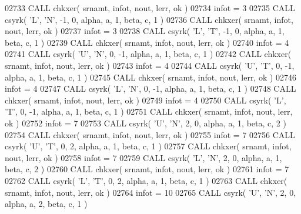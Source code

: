 \begin{DoxyCode}
02733       \textcolor{keyword}{CALL }chkxer( srnamt, infot, nout, lerr, ok )
02734       infot = 3
02735       \textcolor{keyword}{CALL }csyrk( \textcolor{stringliteral}{'L'}, \textcolor{stringliteral}{'N'}, -1, 0, alpha, a, 1, beta, c, 1 )
02736       \textcolor{keyword}{CALL }chkxer( srnamt, infot, nout, lerr, ok )
02737       infot = 3
02738       \textcolor{keyword}{CALL }csyrk( \textcolor{stringliteral}{'L'}, \textcolor{stringliteral}{'T'}, -1, 0, alpha, a, 1, beta, c, 1 )
02739       \textcolor{keyword}{CALL }chkxer( srnamt, infot, nout, lerr, ok )
02740       infot = 4
02741       \textcolor{keyword}{CALL }csyrk( \textcolor{stringliteral}{'U'}, \textcolor{stringliteral}{'N'}, 0, -1, alpha, a, 1, beta, c, 1 )
02742       \textcolor{keyword}{CALL }chkxer( srnamt, infot, nout, lerr, ok )
02743       infot = 4
02744       \textcolor{keyword}{CALL }csyrk( \textcolor{stringliteral}{'U'}, \textcolor{stringliteral}{'T'}, 0, -1, alpha, a, 1, beta, c, 1 )
02745       \textcolor{keyword}{CALL }chkxer( srnamt, infot, nout, lerr, ok )
02746       infot = 4
02747       \textcolor{keyword}{CALL }csyrk( \textcolor{stringliteral}{'L'}, \textcolor{stringliteral}{'N'}, 0, -1, alpha, a, 1, beta, c, 1 )
02748       \textcolor{keyword}{CALL }chkxer( srnamt, infot, nout, lerr, ok )
02749       infot = 4
02750       \textcolor{keyword}{CALL }csyrk( \textcolor{stringliteral}{'L'}, \textcolor{stringliteral}{'T'}, 0, -1, alpha, a, 1, beta, c, 1 )
02751       \textcolor{keyword}{CALL }chkxer( srnamt, infot, nout, lerr, ok )
02752       infot = 7
02753       \textcolor{keyword}{CALL }csyrk( \textcolor{stringliteral}{'U'}, \textcolor{stringliteral}{'N'}, 2, 0, alpha, a, 1, beta, c, 2 )
02754       \textcolor{keyword}{CALL }chkxer( srnamt, infot, nout, lerr, ok )
02755       infot = 7
02756       \textcolor{keyword}{CALL }csyrk( \textcolor{stringliteral}{'U'}, \textcolor{stringliteral}{'T'}, 0, 2, alpha, a, 1, beta, c, 1 )
02757       \textcolor{keyword}{CALL }chkxer( srnamt, infot, nout, lerr, ok )
02758       infot = 7
02759       \textcolor{keyword}{CALL }csyrk( \textcolor{stringliteral}{'L'}, \textcolor{stringliteral}{'N'}, 2, 0, alpha, a, 1, beta, c, 2 )
02760       \textcolor{keyword}{CALL }chkxer( srnamt, infot, nout, lerr, ok )
02761       infot = 7
02762       \textcolor{keyword}{CALL }csyrk( \textcolor{stringliteral}{'L'}, \textcolor{stringliteral}{'T'}, 0, 2, alpha, a, 1, beta, c, 1 )
02763       \textcolor{keyword}{CALL }chkxer( srnamt, infot, nout, lerr, ok )
02764       infot = 10
02765       \textcolor{keyword}{CALL }csyrk( \textcolor{stringliteral}{'U'}, \textcolor{stringliteral}{'N'}, 2, 0, alpha, a, 2, beta, c, 1 )

\end{DoxyCode}
